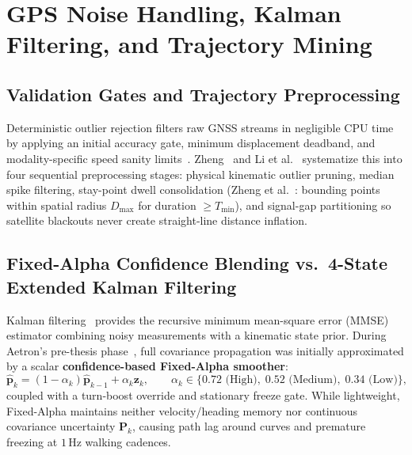\section{GPS Noise Handling, Kalman Filtering, and Trajectory Mining}
\label{sec:filtering_theory}

\subsection{Validation Gates and Trajectory Preprocessing}
Deterministic outlier rejection filters raw GNSS streams in negligible CPU time by applying an initial accuracy gate, minimum displacement deadband, and modality-specific speed sanity limits~\cite{harle2013survey}. Zheng~\cite{zheng2015trajectory} and Li et al.~\cite{li2025trajectory} systematize this into four sequential preprocessing stages: physical kinematic outlier pruning, median spike filtering, stay-point dwell consolidation (Zheng et al.~\cite{zheng2009mining}: bounding points within spatial radius $D_{\max}$ for duration $\ge T_{\min}$), and signal-gap partitioning so satellite blackouts never create straight-line distance inflation.

\subsection{Fixed-Alpha Confidence Blending vs.\ 4-State Extended Kalman Filtering}
Kalman filtering~\cite{kalman1960filter} provides the recursive minimum mean-square error (MMSE) estimator combining noisy measurements with a kinematic state prior. During Aetron's pre-thesis phase~\cite{aetron2026prethesis}, full covariance propagation was initially approximated by a scalar \textbf{confidence-based Fixed-Alpha smoother}:
\begin{equation}
    \hat{\mathbf{p}}_k = (1 - \alpha_k)\hat{\mathbf{p}}_{k-1} + \alpha_k \mathbf{z}_k, \qquad
    \alpha_k \in \{0.72\text{ (High)}, \; 0.52\text{ (Medium)}, \; 0.34\text{ (Low)}\},
\end{equation}
coupled with a turn-boost override and stationary freeze gate. While lightweight, Fixed-Alpha maintains neither velocity/heading memory nor continuous covariance uncertainty $\mathbf{P}_k$, causing path lag around curves and premature freezing at $1$\,Hz walking cadences.

